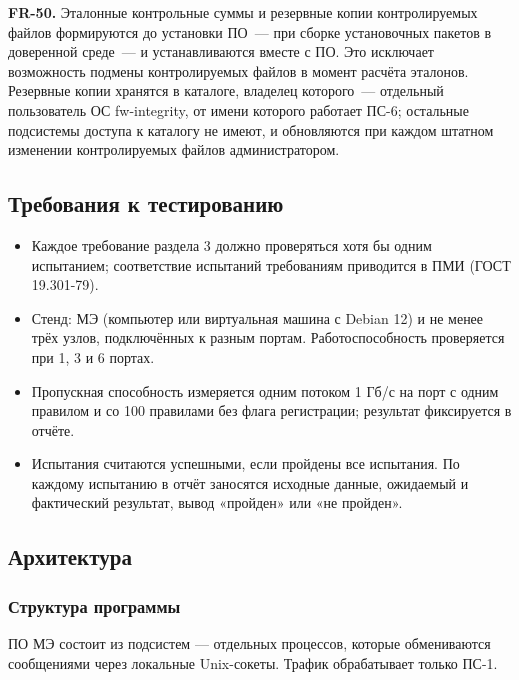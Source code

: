 \documentclass[13pt,a4paper,final]{article}
\begin{document}
	\textbf{FR-50.} \textcolor{edit}{Эталонные контрольные суммы и резервные копии контролируемых файлов формируются до установки ПО~--- при сборке установочных пакетов в доверенной среде~--- и устанавливаются вместе с ПО.} Это исключает возможность подмены контролируемых файлов в момент расчёта эталонов. Резервные копии хранятся в каталоге, \textcolor{edit}{владелец которого~--- отдельный пользователь ОС fw-integrity, от имени которого работает ПС-6; остальные подсистемы доступа к каталогу не имеют,} и обновляются при каждом штатном изменении контролируемых файлов администратором.
	
	\subsection{Требования к тестированию}
	
	\begin{itemize}
		\item Каждое требование раздела 3 должно проверяться хотя бы одним испытанием; соответствие испытаний требованиям приводится в ПМИ (ГОСТ 19.301-79).
		\item Стенд: МЭ (компьютер или виртуальная машина с Debian 12) и не менее трёх узлов, подключённых к разным портам. Работоспособность проверяется при 1, 3 и 6 портах.
		\item Пропускная способность измеряется одним потоком 1 Гб/с на порт с одним правилом и со 100 правилами без флага регистрации; результат фиксируется в отчёте.
		\item Испытания считаются успешными, если пройдены все испытания. По каждому испытанию в отчёт заносятся исходные данные, ожидаемый и фактический результат, вывод «пройден» или «не пройден».
	\end{itemize}
	
	\subsection{Архитектура}
	
	\subsubsection{Структура программы}
	
	ПО МЭ состоит из подсистем — отдельных процессов, которые обмениваются сообщениями через локальные Unix-сокеты. Трафик обрабатывает только ПС-1.
	
\end{document}
